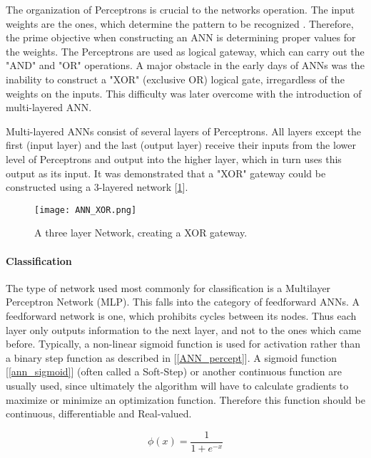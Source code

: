	The organization of Perceptrons is crucial to the networks operation. The input weights are the ones, which determine the pattern to be recognized \cite{bishop1995neural}. Therefore, the prime objective when constructing an ANN is determining proper values for the weights. The Perceptrons are used as logical gateway, which can carry out the "AND" and "OR" operations. A major obstacle in the early days of ANNs was the inability to construct  a "XOR" (exclusive OR) logical gate, irregardless of the weights on the inputs. This difficulty was later overcome with the introduction of multi-layered ANN.
	
	Multi-layered ANNs consist of several layers of Perceptrons. All layers except the first (input layer) and the last (output layer) receive their inputs from the lower level of Perceptrons and output into the higher layer, which in turn uses this output as its input. It was demonstrated that a "XOR" gateway could be constructed using a 3-layered network [\ref{ANN_XOR}].
	
	\begin{figure}[h]
		\centering
		\captionsetup{width=0.8\textwidth}
		\texttt{[image: ANN\_XOR.png]}
		\caption[ANN XOR Perceptron-Network]{
			\footnotesize{
				A three layer Network, creating a XOR gateway.
			}
		} 
		\label{ANN_XOR}
	\end{figure}	
	
	
	\paragraph{Classification}
		The type of network used most commonly for classification is a Multilayer Perceptron Network (MLP). This falls into the category of feedforward ANNs. A feedforward network is one, which prohibits cycles between its nodes. Thus each layer only outputs information to the next layer, and not to the ones which came before. Typically, a non-linear sigmoid function is used for activation rather than a binary step function as described in [\ref{ANN_percept}]. A sigmoid function [\ref{ann_sigmoid}] (often called a Soft-Step) or another continuous function are usually used, since ultimately the algorithm will have to calculate gradients to maximize or minimize an optimization function. Therefore this function should be continuous, differentiable and Real-valued.
		
		\begin{equation}
			\phi(x) = \frac{1}{1+ e^{-x}}
			\label{ann_sigmoid}
		\end{equation}
			
